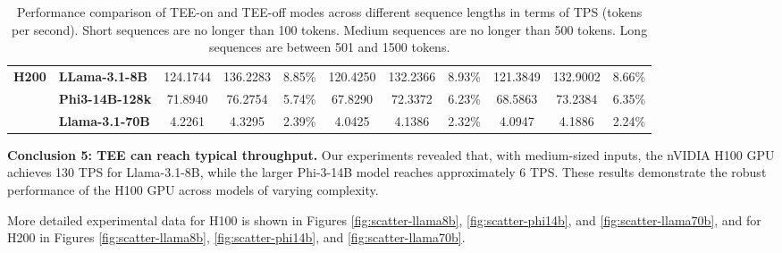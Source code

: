\documentclass{article}
\begin{document}
\begin{table}[htbp]
{\begin{tabular}{llccc|ccc|ccc}
            \midrule
            \multirow{3}{*}{\textbf{H200}} & \textbf{LLama-3.1-8B}  & 124.1744                                            & 136.2283                                             & 8.85\%                                             & 120.4250        & 132.2366         & 8.93\%                                                                     & 121.3849        & 132.9002         & 8.66\%                                                                     \\
            & \textbf{Phi3-14B-128k} & 71.8940                                             & 76.2754                                              & 5.74\%                                             & 67.8290         & 72.3372          & 6.23\%                                                                     & 68.5863         & 73.2384          & 6.35\%                                                                     \\
            & \textbf{Llama-3.1-70B} & 4.2261                                              & 4.3295                                               & 2.39\%                                             & 4.0425          & 4.1386           & 2.32\%                                                                     & 4.0947          & 4.1886          & 2.24\%                                                                     \\
            \bottomrule
        \end{tabular}%
    }
    \caption{Performance comparison of TEE-on and TEE-off modes across different sequence lengths in terms of TPS (tokens per second). Short sequences are no longer than 100 tokens. Medium sequences are no longer than 500 tokens. Long sequences are between 501 and 1500 tokens.}
    \label{tab:tps_short_medium_long}
\end{table}

\noindent\textbf{Conclusion 5: TEE can reach typical throughput.}
Our experiments revealed that, with medium-sized inputs, the nVIDIA H100 GPU achieves 130 TPS for Llama-3.1-8B, while the larger Phi-3-14B model reaches approximately 6 TPS. These results demonstrate the robust performance of the H100 GPU across models of varying complexity.

More detailed experimental data for H100 is shown in Figures \ref{fig:scatter-llama8b}, \ref{fig:scatter-phi14b}, and \ref{fig:scatter-llama70b}, and for H200 in Figures \ref{fig:scatter-llama8b}, \ref{fig:scatter-phi14b}, and \ref{fig:scatter-llama70b}.
\end{document}
